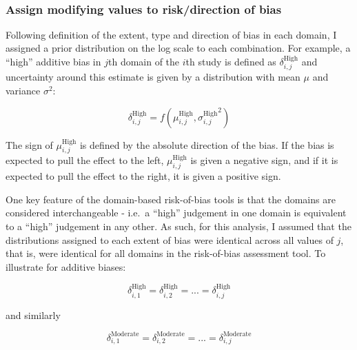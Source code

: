 \documentclass[a4paper, twoside]{templates/ociamthesis}
\begin{document}
~

\hypertarget{tri-bias-assign}{%
\subsubsection{Assign modifying values to risk/direction of bias}\label{tri-bias-assign}}

Following definition of the extent, type and direction of bias in each domain, I assigned a prior distribution on the log scale to each combination. For example, a ``high'' additive bias in \(j\)th domain of the \(i\)th study is defined as \(\delta_{i,j}^{\mathrm{High}}\) and uncertainty around this estimate is given by a distribution with mean \(\mu\) and variance \(\sigma^{2}\):

\begin{equation}
  \delta_{i,j}^{\mathrm{High}} = f(\mu_{i,j}^{\mathrm{High}}, {\sigma_{i,j}^{\mathrm{High}}}^{2})
  \label{eq:additive-single}
\end{equation}

The sign of \(\mu_{i,j}^{\mathrm{High}}\) is defined by the absolute direction of the bias. If the bias is expected to pull the effect to the left, \(\mu_{i,j}^{\mathrm{High}}\) is given a negative sign, and if it is expected to pull the effect to the right, it is given a positive sign.

One key feature of the domain-based risk-of-bias tools is that the domains are considered interchangeable - i.e.~a ``high'' judgement in one domain is equivalent to a ``high'' judgement in any other. As such, for this analysis, I assumed that the distributions assigned to each extent of bias were identical across all values of \(j\), that is, were identical for all domains in the risk-of-bias assessment tool. To illustrate for additive biases:

\[
\delta_{i,1}^{\mathrm{High}} = \delta_{i,2}^{\mathrm{High}} = ... = \delta_{i,j}^{\mathrm{High}}
\]

and similarly

\[
\delta_{i,1}^{\mathrm{Moderate}} = \delta_{i,2}^{\mathrm{Moderate}} = ... = \delta_{i,j}^{\mathrm{Moderate}}
\]
\end{document}
